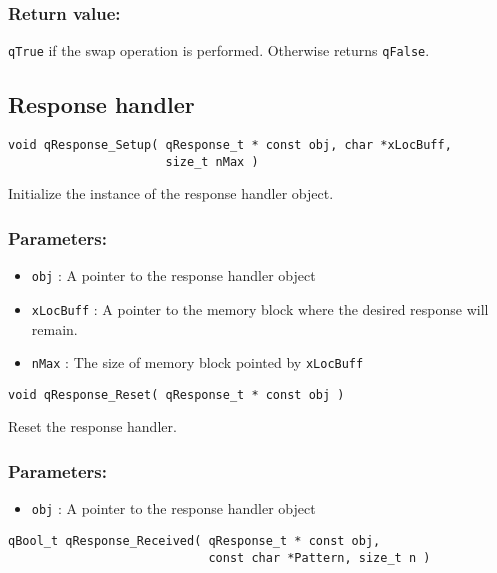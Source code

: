 \subsubsection*{Return value:}
\lstinline{qTrue} if the swap operation is performed. Otherwise returns \lstinline{qFalse}.


\subsection{Response handler}

\begin{lstlisting}[style=CStyle]
void qResponse_Setup( qResponse_t * const obj, char *xLocBuff, 
                      size_t nMax )
\end{lstlisting}

Initialize the instance of the response handler object. 

\subsubsection*{Parameters:}
\begin{itemize}
    \item \lstinline{obj} : A pointer to the response handler object
    \item \lstinline{xLocBuff} : A pointer to the memory block where the desired response will remain.
    \item \lstinline{nMax} : The size of memory block pointed by \lstinline{xLocBuff}
\end{itemize}

\noindent\hrulefill

\begin{lstlisting}[style=CStyle]
void qResponse_Reset( qResponse_t * const obj )
\end{lstlisting}

Reset the response handler. 

\subsubsection*{Parameters:}
\begin{itemize}
    \item \lstinline{obj} : A pointer to the response handler object
\end{itemize}

\noindent\hrulefill

\begin{lstlisting}[style=CStyle]
qBool_t qResponse_Received( qResponse_t * const obj, 
                            const char *Pattern, size_t n )
\end{lstlisting}

